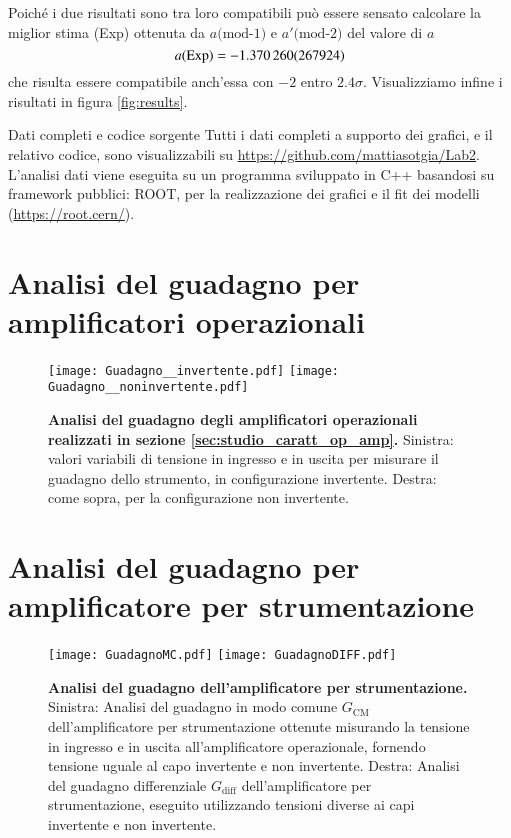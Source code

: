 \documentclass[
    rmp,
    reprint, 
    superscriptaddress, 
    altaffilletter, 
    amsmath, 
    amssymb,
    a4paper]{revtex4-2}
\begin{document}
Poiché i due risultati sono tra loro compatibili può essere sensato calcolare la miglior stima (Exp) ottenuta da $a\text{(mod-1)}$ e $a'\text{(mod-2)}$ del valore di $a$ \[a\text{(Exp)} = \num{-1.37026 +- 0.267924}\] che risulta essere compatibile anch'essa con $-2$ entro $2.4\sigma$. Visualizziamo infine i risultati in figura \ref{fig:results}.



\begin{methods}{D\lowercase{ati completi e codice sorgente}}
    Tutti i dati completi a supporto dei grafici, e il relativo codice, sono visualizzabili su \url{https://github.com/mattiasotgia/Lab2}. L'analisi dati viene eseguita su un programma sviluppato in C++ basandosi su framework pubblici: ROOT, per la realizzazione dei grafici e il fit dei modelli (\url{https://root.cern/}).
\end{methods}

\onecolumngrid
\appendix
\newpage
\section{Analisi del guadagno per amplificatori operazionali}

\renewcommand{\thetable}{A-\arabic{table}}
\renewcommand{\thefigure}{A-\arabic{figure}}
\begin{figure}[!h]
    \raggedright
    \texttt{[image: Guadagno\_\_invertente.pdf]}
    \texttt{[image: Guadagno\_\_noninvertente.pdf]}
    \caption{\textbf{Analisi del guadagno degli amplificatori operazionali realizzati in sezione \ref{sec:studio_caratt_op_amp}.} Sinistra: valori variabili di tensione in ingresso e in uscita per misurare il guadagno dello strumento, in configurazione invertente. Destra: come sopra, per la configurazione non invertente.}
    \label{fig:guadagno_inv_noninv}
\end{figure}

\section{Analisi del guadagno per amplificatore per strumentazione}

\renewcommand{\thetable}{B-\arabic{table}}
\renewcommand{\thefigure}{B-\arabic{figure}}

\begin{figure}[!h]
    \raggedright
    \texttt{[image: GuadagnoMC.pdf]}
    \texttt{[image: GuadagnoDIFF.pdf]}
    \caption{\textbf{Analisi del guadagno dell'amplificatore per strumentazione.} Sinistra: Analisi del guadagno in modo comune $G_{\text{CM}}$ dell'amplificatore per strumentazione ottenute misurando la tensione in ingresso e in uscita all'amplificatore operazionale, fornendo tensione uguale al capo invertente e non invertente. Destra: Analisi del guadagno differenziale $G_{\text{diff}}$ dell'amplificatore per strumentazione, eseguito utilizzando tensioni diverse ai capi invertente e non invertente.}
    \label{fig:guadagno_op_amp_strum}
\end{figure}
\end{document}
